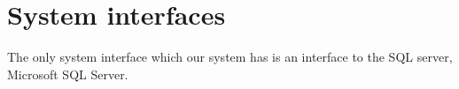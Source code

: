 \section{System interfaces}
\label{sec:system_interfaces}

The only system interface which our system has is an interface to the SQL server, Microsoft SQL Server. 